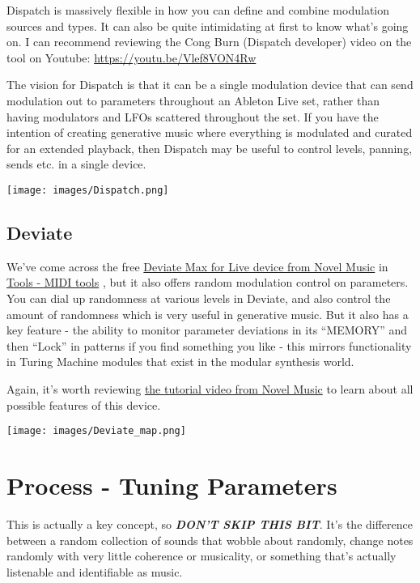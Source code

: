 \documentclass[
  12pt,
  letterpaper,
  oneside,
  open=any]{scrbook}
\begin{document}
Dispatch is massively flexible in how you can define and combine
modulation sources and types. It can also be quite intimidating at first
to know what's going on. I can recommend reviewing the Cong Burn
(Dispatch developer) video on the tool on Youtube:
\url{https://youtu.be/Vlef8VON4Rw}

The vision for Dispatch is that it can be a single modulation device
that can send modulation out to parameters throughout an Ableton Live
set, rather than having modulators and LFOs scattered throughout the
set. If you have the intention of creating generative music where
everything is modulated and curated for an extended playback, then
Dispatch may be useful to control levels, panning, sends etc. in a
single device.

\texttt{[image: images/Dispatch.png]}

\section{Deviate}\label{deviate-1}

We've come across the free
\href{https://www.novelmusic.org/m4l/deviate}{Deviate Max for Live
device from Novel Music} in
\hyperref[Chapter-004-Tools-MIDI_tools]{Tools - MIDI tools} , but it
also offers random modulation control on parameters. You can dial up
randomness at various levels in Deviate, and also control the amount of
randomness which is very useful in generative music. But it also has a
key feature - the ability to monitor parameter deviations in its
``MEMORY'' and then ``Lock'' in patterns if you find something you like
- this mirrors functionality in Turing Machine modules that exist in the
modular synthesis world.

Again, it's worth reviewing
\href{https://www.youtube.com/watch?v=4WwKGUV2H4I}{the tutorial video
from Novel Music} to learn about all possible features of this device.

\texttt{[image: images/Deviate\_map.png]}


\chapter{Process - Tuning
Parameters}\label{Chapter-008-Process-Tuning_Parameters}

This is actually a key concept, so \textbf{\emph{DON'T SKIP THIS BIT}}.
It's the difference between a random collection of sounds that wobble
about randomly, change notes randomly with very little coherence or
musicality, or something that's actually listenable and identifiable as
music.
\end{document}
